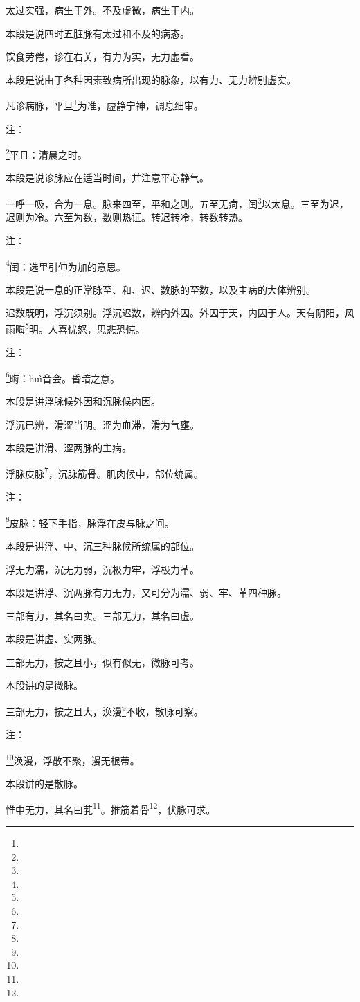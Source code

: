 \documentclass[a4paper,12pt,UTF8,twoside]{ctexbook}
\begin{document}
太过实强，病生于外。不及虚微，病生于内。

本段是说四时五脏脉有太过和不及的病态。

饮食劳倦，诊在右关，有力为实，无力虚看。

本段是说由于各种因素致病所出现的脉象，以有力、无力辨别虚实。

凡诊病脉，平旦\footnote{}为准，虚静宁神，调息细审。

注：

\footnote{}平且：清晨之时。

本段是说诊脉应在适当时间，并注意平心静气。

一呼一吸，合为一息。脉来四至，平和之则。五至无疴，闰\footnote{}以太息。三至为迟，迟则为冷。六至为数，数则热证。转迟转冷，转数转热。

注：

\footnote{}闰：选里引伸为加的意思。

本段是说一息的正常脉至、和、迟、数脉的至数，以及主病的大体辨别。

迟数既明，浮沉须别。浮沉迟数，辨内外因。外因于天，内因于人。天有阴阳，风雨晦\footnote{}明。人喜忧怒，思悲恐惊。

注：

\footnote{}晦：huì音会。昏暗之意。

本段是讲浮脉候外因和沉脉候内因。

浮沉已辨，滑涩当明。涩为血滞，滑为气壅。

本段是讲滑、涩两脉的主病。

浮脉皮脉\footnote{}，沉脉筋骨。肌肉候中，部位统属。

注：

\footnote{}皮脉：轻下手指，脉浮在皮与脉之间。

本段是讲浮、中、沉三种脉候所统属的部位。

浮无力濡，沉无力弱，沉极力牢，浮极力革。

本段是讲浮、沉两脉有力无力，又可分为濡、弱、牢、革四种脉。

三部有力，其名曰实。三部无力，其名曰虚。

本段是讲虚、实两脉。

三部无力，按之且小，似有似无，微脉可考。

本段讲的是微脉。

三部无力，按之且大，涣漫\footnote{}不收，散脉可察。

注：

\footnote{}涣漫，浮散不聚，漫无根蒂。

本段讲的是散脉。

惟中无力，其名曰芤\footnote{}。推筋着骨\footnote{}，伏脉可求。
\end{document}
